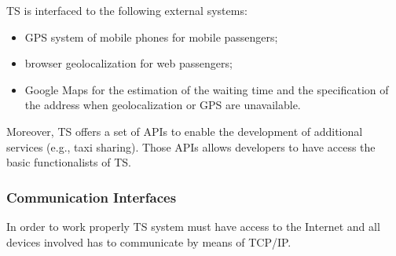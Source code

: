 TS is interfaced to the following external systems:
\begin{itemize}
\item GPS system of mobile phones for mobile passengers;
\item browser geolocalization for web passengers;
\item Google Maps for the estimation of the waiting time and the specification
of the address when geolocalization or GPS are unavailable.
\end{itemize}
Moreover, TS offers a set of APIs to enable the development of additional
services (e.g., taxi sharing). Those APIs allows developers to have
access the basic functionalists of TS.


\subsubsection{Communication Interfaces }

In order to work properly TS system must have access to the Internet
and all devices involved has to communicate by means of TCP/IP.
